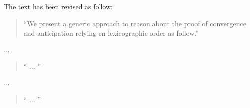 \documentclass{response}
\begin{document}
\begin{comment}{Reviewer \#1}
• typo. relying on lexicographic order . . .
\end{comment}

\begin{response}
  The text has been revised as follow:
  \begin{quote}
    ``We present a generic approach
    to reason about the proof of convergence and anticipation relying on
    lexicographic order as follow.''
  \end{quote}
\end{response}



\begin{comment}{Reviewer \#1}
• The paragraph Proof of Convergence and Anticipation needs to
be written again. There are many typos: this event removes, discards,
decreases, accroding, . . .
Moreover the sentence
The external events are anticipated accroding to the above variants triv-
ially since they only modify the external queue eQ. Note that we do not
attempt to prove the convergence of any future events here. Instead, we
assume that these future events will be prove to be convergence later.
seems to me problematic. In your definition of anticipated you did not
say that these events should be proven convergent later?
\end{comment}

\begin{response}
  ...
  \begin{quote}
    `` ...
   ''
  \end{quote}
\end{response}



\begin{comment}{Reviewer \#1}
• p.25 could you state explicitly your strong fairness property and the
interplay with the temporal properties you are concerned with.
\end{comment}

\begin{response}
  ...
  \begin{quote}
    `` ...
   ''
  \end{quote}
\end{response}


\begin{comment}{Reviewer \#1}
• p.25 A reference to the seminal Unless of Unity could be in order.
\end{comment}
\end{document}
